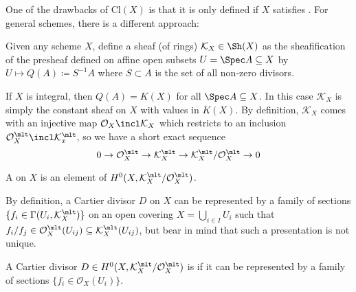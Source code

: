 \documentclass[wip, algebra]{bsteffan-lecturenotes}
\newcommand{\cO}{\mathcal{O}}
\newcommand{\cK}{\mathcal{K}}
\newcommand{\Cl}{\mathrm{Cl}}
\begin{document}
One of the drawbacks of $\Cl(X)$ is that it is only defined if $X$ satisfies .
For general schemes, there is a different approach:
\begin{definition}
	Given any scheme $X$, define a sheaf (of rings) $\cK_X \in \Sh(X)$ as the sheafification of the presheaf defined on affine open subsets $U = \Spec A \subseteq X$ by $U \mapsto Q(A) \coloneq S^{-1} A$ where $S \subset A$ is the set of all non-zero divisors.
\end{definition}
If $X$ is integral, then $Q(A) = K(X)$ for all $\Spec A \subseteq X$.
In this case $\cK_X$ is simply the constant sheaf on $X$ with values in $K(X)$.
By definition, $\cK_X$ comes with an injective map $\cO_X \incl \cK_X$ which restricts to an inclusion $\cO_X^\mlt \incl \cK_x^\mlt$, so we have a short exact sequence
\begin{equation*}
	0 \to \cO_X^\mlt \to \cK_X^\mlt \to \cK_X^\mlt / \cO_X^\mlt \to 0
\end{equation*}
\begin{definition}
	A  on $X$ is an element of $H^0(X, \cK_X^\mlt / \cO_X^\mlt)$.
\end{definition}
By definition, a Cartier divisor $D$ on $X$ can be represented by a family of sections $\{f_i \in \Gamma(U_i, \cK_X^\mlt)\}$ on an open covering $X = \bigcup_{i \in I} U_i$ such that $f_i / f_j \in \cO_X^\mlt(U_{ij}) \subseteq \cK_X^\mlt(U_{ij})$, but bear in mind that such a presentation is not unique.
\begin{definition}
	A Cartier divisor $D \in H^0(X, \cK_X^\mlt / \cO_X^\mlt)$ is  if it can be represented by a family of sections $\{f_i \in \cO_X(U_i)\}$.
\end{definition}
\end{document}
